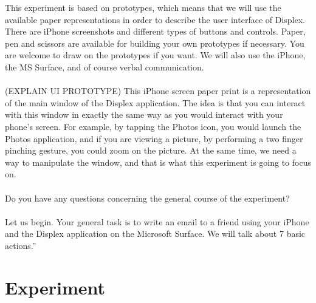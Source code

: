 \documentclass[11pt]{amsart}
\begin{document}
This experiment is based on prototypes, which means that we will use the available paper representations in order to describe the user interface of Displex.
There are iPhone screenshots and different types of buttons and controls.
Paper, pen and scissors are available for building your own prototypes if necessary.
You are welcome to draw on the prototypes if you want.
We will also use the iPhone, the MS Surface, and of course verbal communication.
\\\\
(EXPLAIN UI PROTOTYPE)
This iPhone screen paper print is a representation of the main window of the Displex application.
The idea is that you can interact with this window in exactly the same way as you would interact with your phone's screen.
For example, by tapping the Photos icon, you would launch the Photos application, and if you are viewing a picture, by performing a two finger pinching gesture, you could zoom on the picture.
At the same time, we need a way to manipulate the window, and that is what this experiment is going to focus on. 
\\\\
Do you have any questions concerning the general course of the experiment?
\\\\
Let us begin.
Your general task is to write an email to a friend using your iPhone and the Displex application on the Microsoft Surface.
We will talk about 7 basic actions.''

\section{Experiment}
\end{document}
